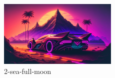 \documentclass{article}
\begin{document}
	\begin{figure}
		\centering
		\includegraphics[width=0.5\textwidth]{images/image1}
		\caption{2-sea-full-moon}
		\label{fig:example}
	\end{figure}
\end{document}
